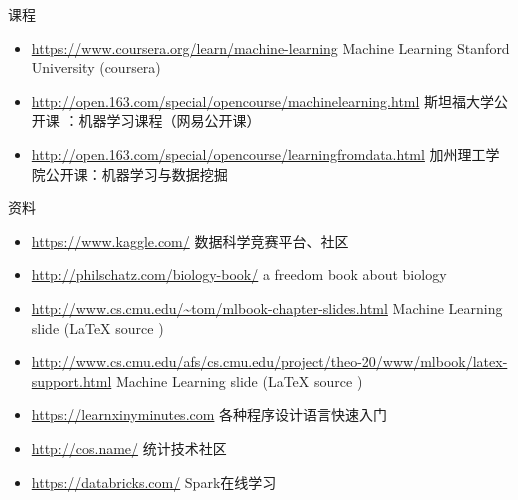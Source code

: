 \documentclass[aspectratio=169]{beamer}
\begin{document}
\begin{frame}[label={sec:org1159f5f}]{课程}
\begin{itemize}
\item \url{https://www.coursera.org/learn/machine-learning}  Machine Learning Stanford University (coursera)
\item \url{http://open.163.com/special/opencourse/machinelearning.html}  斯坦福大学公开课 ：机器学习课程（网易公开课）
\item \url{http://open.163.com/special/opencourse/learningfromdata.html} 加州理工学院公开课：机器学习与数据挖掘
\end{itemize}
\end{frame}
\begin{frame}[label={sec:org3a0b684}]{资料}
\begin{itemize}
\item \url{https://www.kaggle.com/}
数据科学竞赛平台、社区
\item \url{http://philschatz.com/biology-book/}  
a  freedom book about biology
\item \href{http://www.cs.cmu.edu/\~tom/mlbook-chapter-slides.html}{http://www.cs.cmu.edu/\textasciitilde tom/mlbook-chapter-slides.html}
Machine Learning slide (\LaTeX{} source )
\item \url{http://www.cs.cmu.edu/afs/cs.cmu.edu/project/theo-20/www/mlbook/latex-support.html} 
Machine Learning slide (\LaTeX{} source )
\item \url{https://learnxinyminutes.com}  
各种程序设计语言快速入门
\item \url{http://cos.name/}
统计技术社区
\item \url{https://databricks.com/}
Spark在线学习
\end{itemize}
\end{frame}
\end{document}
